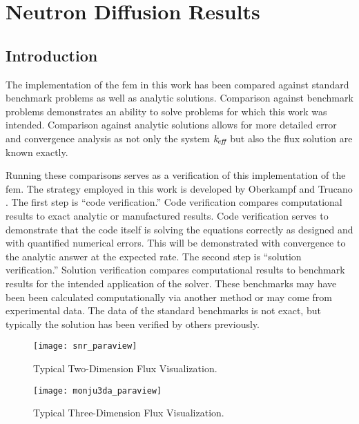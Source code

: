 \chapter{Neutron Diffusion Results}
\label{ch:diffusionResults}

\section{Introduction}
  The implementation of the \gls{fem} in this work has been compared
  against standard benchmark problems as well as analytic solutions. Comparison 
  against benchmark problems demonstrates an ability to solve problems for which 
  this work was intended. Comparison against analytic solutions allows for more 
  detailed error and convergence analysis as not only the system $k_{\!\mbox{\scriptsize \em eff}}$ but 
  also the flux solution are known exactly. 

  Running these comparisons serves as a verification of this implementation of 
  the \gls{fem}. The strategy employed in this work is developed by Oberkampf
  and Trucano \cite{oberkampf}. The first step is 
  ``code verification.'' Code verification compares computational results to 
  exact analytic or manufactured results. Code verification serves to 
  demonstrate that the code itself is solving the equations correctly as 
  designed and with quantified numerical errors. This will be demonstrated with 
  convergence to the analytic answer at the expected rate. The second step is 
  ``solution verification.'' Solution verification compares computational 
  results to benchmark results for the intended application of the solver. These 
  benchmarks may have been been calculated computationally via another method or 
  may come from experimental data. The data of the standard benchmarks is not 
  exact, but typically the solution has been verified by others previously.

  \begin{figure}
    \centering
    \texttt{[image: snr\_paraview]}
    \caption{Typical Two-Dimension Flux Visualization.}
    \label{fig:snr_paraview}
  \end{figure}

  \begin{figure}
    \centering
    \texttt{[image: monju3da\_paraview]}
    \caption{Typical Three-Dimension Flux Visualization.}
    \label{fig:monju3da_paraview}
  \end{figure}


